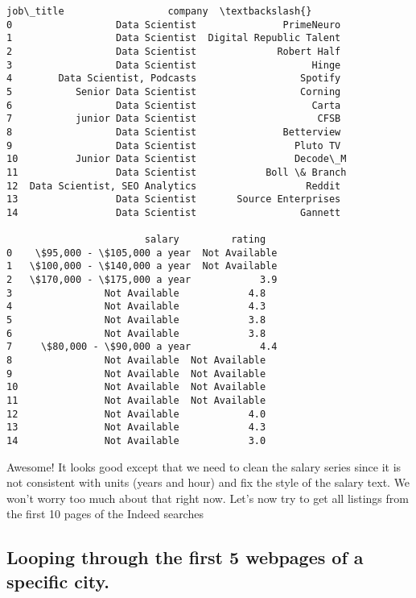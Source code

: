 \documentclass[11pt]{article}
\makeatletter
\newcommand{\boxspacing}{\kern\kvtcb@left@rule\kern\kvtcb@boxsep}
\newcommand{\prompt}[4]{
        \ttfamily\llap{{\color{#2}[#3]:\hspace{3pt}#4}}\vspace{-\baselineskip}
    }
\makeatother
\begin{document}
            \begin{tcolorbox}[breakable, size=fbox, boxrule=.5pt, pad at break*=1mm, opacityfill=0]
\prompt{Out}{outcolor}{10}{\boxspacing}
\begin{Verbatim}[commandchars=\\\{\}]
                        job\_title                  company  \textbackslash{}
0                  Data Scientist               PrimeNeuro
1                  Data Scientist  Digital Republic Talent
2                  Data Scientist              Robert Half
3                  Data Scientist                    Hinge
4        Data Scientist, Podcasts                  Spotify
5           Senior Data Scientist                  Corning
6                  Data Scientist                    Carta
7           junior Data Scientist                     CFSB
8                  Data Scientist               Betterview
9                  Data Scientist                 Pluto TV
10          Junior Data Scientist                 Decode\_M
11                 Data Scientist            Boll \& Branch
12  Data Scientist, SEO Analytics                   Reddit
13                 Data Scientist       Source Enterprises
14                 Data Scientist                  Gannett

                        salary         rating
0    \$95,000 - \$105,000 a year  Not Available
1   \$100,000 - \$140,000 a year  Not Available
2   \$170,000 - \$175,000 a year            3.9
3                Not Available            4.8
4                Not Available            4.3
5                Not Available            3.8
6                Not Available            3.8
7     \$80,000 - \$90,000 a year            4.4
8                Not Available  Not Available
9                Not Available  Not Available
10               Not Available  Not Available
11               Not Available  Not Available
12               Not Available            4.0
13               Not Available            4.3
14               Not Available            3.0
\end{Verbatim}
\end{tcolorbox}
        
    Awesome! It looks good except that we need to clean the salary series
since it is not consistent with units (years and hour) and fix the style
of the salary text. We won't worry too much about that right now. Let's
now try to get all listings from the first 10 pages of the Indeed
searches

    \hypertarget{looping-through-the-first-5-webpages-of-a-specific-city.}{%
\subsection{Looping through the first 5 webpages of a specific
city.}\label{looping-through-the-first-5-webpages-of-a-specific-city.}}
\end{document}
